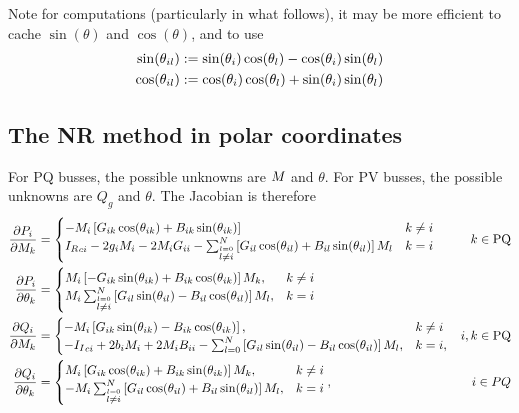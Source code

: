 \documentclass[11pt]{article}
\newcommand{\Ir}{{I_R}}
\newcommand{\Ii}{{I_I}}
\begin{document}
Note for computations (particularly in what follows), it may be more efficient to cache $\sin(\theta)$ and $\cos(\theta)$, and to use
\begin{align}
	\sin(\theta_{il}) &:= \sin(\theta_i)\cos(\theta_l) - \cos(\theta_i)\sin(\theta_l) \notag \\
	\cos(\theta_{il}) &:= \cos(\theta_i)\cos(\theta_l) + \sin(\theta_i)\sin(\theta_l)
\end{align}


\subsection{The NR method in polar coordinates}
For PQ busses, the possible unknowns are $M_{}$ and $\theta$. For PV busses, the possible unknowns are $Q_g$ and $\theta$. The Jacobian is therefore
\begin{align}
	\frac{\partial P_i}{\partial \M{k}} &= 
		\begin{cases}
			-\M{i}\left[G_{ik}\cs{ik} + B_{ik}\sn{ik}\right] & k \ne i \\
			\Ir_{ci} - 2g_i\M{i} - 2 \M{i}G_{ii} - \sum_{\stackrel{l = 0}{l \ne i}}^N{\left[G_{il}\cs{il} + B_{il}\sn{il}\right]\M{l}} & k = i
		\end{cases} & k \in \text{PQ} \notag \\
	\frac{\partial P_i}{\partial \theta_k} &=
		\begin{cases}
			\M{i}\left[-G_{ik}\sn{ik} + B_{ik}\cs{ik}\right]\M{k}, &k \ne i \\
			\M{i}\sum_{\stackrel{l = 0}{l \ne i}}^N{\left[G_{il}\sn{il} - B_{il}\cs{il}\right]\M{l}}, &k = i
		\end{cases} \notag \\
	\frac{\partial Q_i}{\partial \M{k}} &= 
		\begin{cases}
			-\M{i}\left[G_{ik}\sn{ik} - B_{ik}\cs{ik}\right], & k \ne i \\
			-\Ii_{ci} + 2b_i\M{i} + 2\M{i}B_{ii} - \sum_{l = 0}^N{\left[G_{il}\sn{il} - B_{il}\cs{il}\right]M_l}, & k = i, \\
		\end{cases} &  i, k \in \text{PQ} \notag \\
	\frac{\partial Q_i}{\partial \theta_k} &= 
		\begin{cases}
			\M{i}\left[G_{ik}\cs{ik} + B_{ik}\sn{ik}\right]\M{k}, & k \ne i \\
			-\M{i}\sum_{\stackrel{l = 0}{l \ne i}}^N{\left[G_{il}\cs{il} + B_{il}\sn{il}\right]\M{l}}, & k = i \\
		\end{cases}, & i \in PQ
\end{align}
\end{document}
